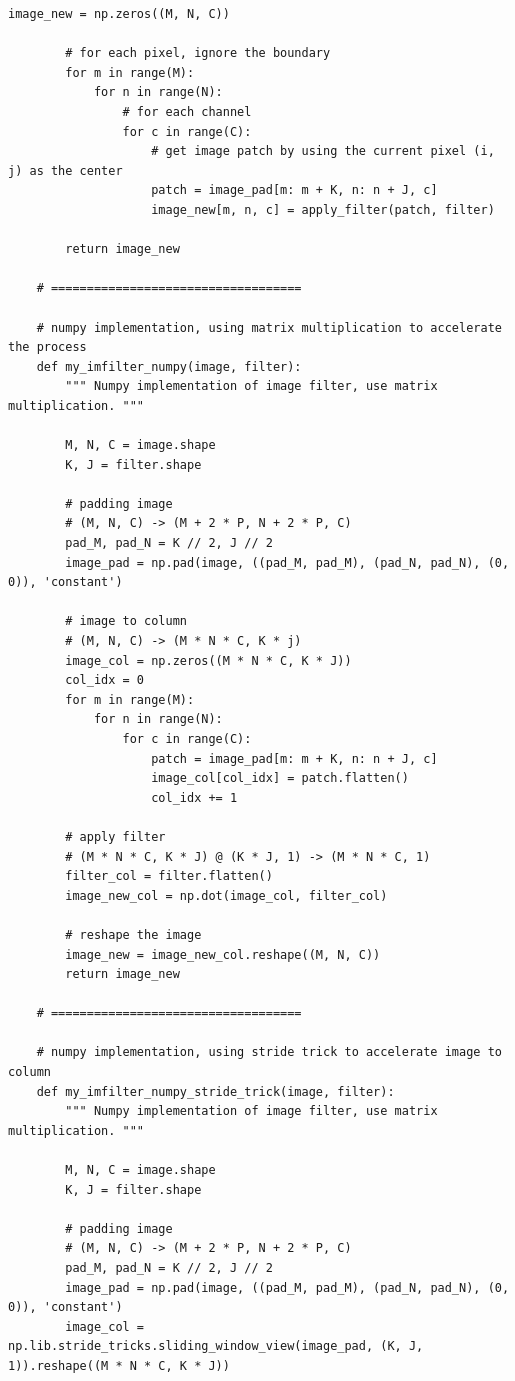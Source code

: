 \begin{lstlisting}[style=Python]
        image_new = np.zeros((M, N, C))
        
        # for each pixel, ignore the boundary
        for m in range(M):
            for n in range(N):
                # for each channel
                for c in range(C):
                    # get image patch by using the current pixel (i, j) as the center
                    patch = image_pad[m: m + K, n: n + J, c]
                    image_new[m, n, c] = apply_filter(patch, filter)
        
        return image_new
    
    # ===================================

    # numpy implementation, using matrix multiplication to accelerate the process
    def my_imfilter_numpy(image, filter):
        """ Numpy implementation of image filter, use matrix multiplication. """

        M, N, C = image.shape
        K, J = filter.shape
        
        # padding image
        # (M, N, C) -> (M + 2 * P, N + 2 * P, C)
        pad_M, pad_N = K // 2, J // 2
        image_pad = np.pad(image, ((pad_M, pad_M), (pad_N, pad_N), (0, 0)), 'constant')

        # image to column
        # (M, N, C) -> (M * N * C, K * j)
        image_col = np.zeros((M * N * C, K * J))
        col_idx = 0
        for m in range(M):
            for n in range(N):
                for c in range(C):
                    patch = image_pad[m: m + K, n: n + J, c]
                    image_col[col_idx] = patch.flatten()
                    col_idx += 1
        
        # apply filter
        # (M * N * C, K * J) @ (K * J, 1) -> (M * N * C, 1)
        filter_col = filter.flatten()
        image_new_col = np.dot(image_col, filter_col)
        
        # reshape the image
        image_new = image_new_col.reshape((M, N, C))
        return image_new

    # ===================================

    # numpy implementation, using stride trick to accelerate image to column
    def my_imfilter_numpy_stride_trick(image, filter):
        """ Numpy implementation of image filter, use matrix multiplication. """

        M, N, C = image.shape
        K, J = filter.shape
        
        # padding image
        # (M, N, C) -> (M + 2 * P, N + 2 * P, C)
        pad_M, pad_N = K // 2, J // 2
        image_pad = np.pad(image, ((pad_M, pad_M), (pad_N, pad_N), (0, 0)), 'constant')
        image_col = np.lib.stride_tricks.sliding_window_view(image_pad, (K, J, 1)).reshape((M * N * C, K * J))
            

\end{lstlisting}

